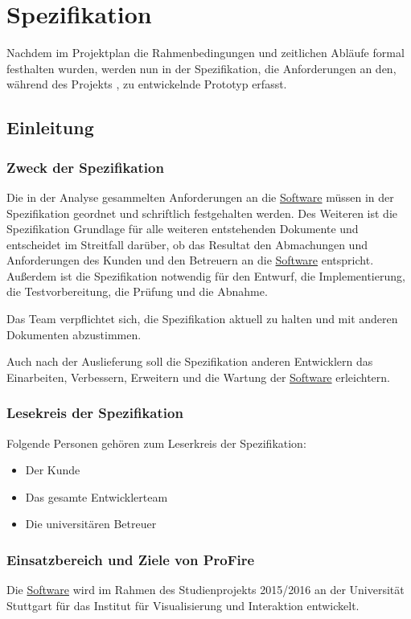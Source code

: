 
\chapter{Spezifikation}
\label{chap:spezi}

Nachdem im Projektplan die Rahmenbedingungen und zeitlichen Abläufe formal festhalten wurden, werden nun in der Spezifikation, die Anforderungen an den, während des Projekts \profire, zu entwickelnde Prototyp erfasst.

\section{Einleitung}

\subsection{Zweck der Spezifikation}
Die in der Analyse gesammelten Anforderungen an die \hyperlink{tab:anwendung}{Software} müssen in der Spezifikation geordnet und schriftlich festgehalten werden.
Des Weiteren ist die Spezifikation Grundlage für alle weiteren entstehenden Dokumente und entscheidet im Streitfall darüber, ob das Resultat den Abmachungen und Anforderungen des Kunden und den Betreuern an die \hyperlink{tab:anwendung}{Software} entspricht.
Außerdem ist die Spezifikation notwendig für den Entwurf, die Implementierung, die Testvorbereitung, die Prüfung und die Abnahme.

Das Team verpflichtet sich, die Spezifikation aktuell zu halten und mit anderen Dokumenten abzustimmen.

Auch nach der Auslieferung soll die Spezifikation anderen Entwicklern das Einarbeiten, Verbessern, Erweitern und die Wartung der \hyperlink{tab:anwendung}{Software} erleichtern.

\subsection{Lesekreis der Spezifikation}
Folgende Personen gehören zum Leserkreis der Spezifikation:
\begin{itemize}
	\item Der Kunde
	\item Das gesamte Entwicklerteam
	\item Die universitären Betreuer
\end{itemize}

\subsection{Einsatzbereich und Ziele von ProFire}
Die \hyperlink{tab:anwendung}{Software} wird im Rahmen des Studienprojekts 2015/2016 an der Universität Stuttgart für das Institut für Visualisierung und Interaktion entwickelt.

